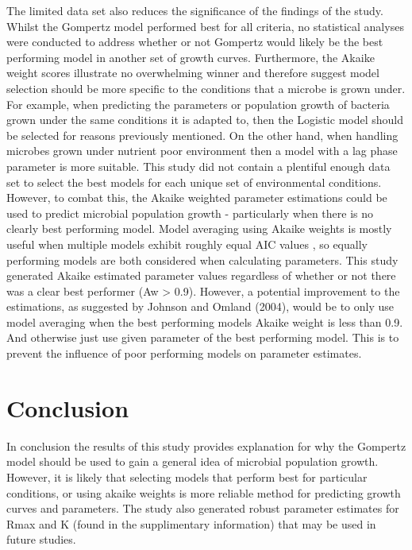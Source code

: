 \documentclass[11pt]{article}
\begin{document}
The limited data set also reduces the significance of the findings of the study. Whilst the Gompertz model performed best for all criteria, no statistical analyses were conducted to address whether or not Gompertz would likely be the best performing model in another set of growth curves. Furthermore, the Akaike weight scores illustrate no overwhelming winner and therefore suggest model selection should be more specific to the conditions that a microbe is grown under. For example, when predicting the parameters or population growth of bacteria grown under the same conditions it is adapted to, then the Logistic model should be selected for reasons previously mentioned. On the other hand, when handling microbes grown under nutrient poor environment then a model with a lag phase parameter is more suitable. This study did not contain a plentiful enough data set to select the best models for each unique set of environmental conditions. However, to combat this, the Akaike weighted parameter estimations could be used to predict microbial population growth - particularly when there is no clearly best performing model. Model averaging using Akaike weights is mostly useful when multiple models exhibit roughly equal AIC values \cite{JOHNSON2004101}, so equally performing models are both considered when calculating parameters. This study generated Akaike estimated parameter values regardless of whether or not there was a clear best performer (Aw > 0.9). However, a potential improvement to the estimations, as suggested by Johnson and Omland (2004), would be to only use model averaging when the best performing models Akaike weight is less than 0.9. And otherwise just use given parameter of the best performing model. This is to prevent the influence of poor performing models on parameter estimates.

\section{Conclusion}
In conclusion the results of this study provides explanation for why the Gompertz model should be used to gain a general idea of microbial population growth. However, it is likely that selecting models that perform best for particular conditions, or using akaike weights is more reliable method for predicting growth curves and parameters. The study also generated robust parameter estimates for Rmax and K (found in the supplimentary information) that may be used in future studies.



 
  
  
  
\end{document}
